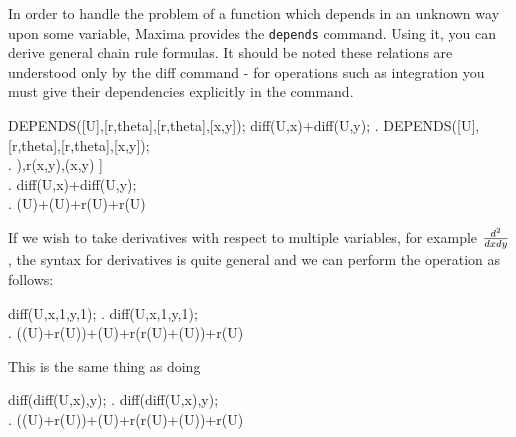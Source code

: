 In order to handle the problem of a function which depends
in an unknown way upon some variable, Maxima provides
the {\tt depends} command.  Using it, you can derive
general chain rule formulas.  It should be noted these
relations are understood only by the diff command - 
for operations such as integration you must give their 
dependencies explicitly in the command.

\beginmaximasession
DEPENDS([U],[r,theta],[r,theta],[x,y]);
diff(U,x)+diff(U,y);
\maximatexsession
{}.  DEPENDS([U],[r,theta],[r,theta],[x,y]); \\
.  \left[ U\left(r,\linebreak[0]\vartheta\right),\linebreak[0]r\left(x,\linebreak[0]y\right),\linebreak[0]\vartheta\left(x,\linebreak[0]y\right) \right] \\
.  diff(U,x)+diff(U,y); \\
.  \*\vartheta\*\left(\*U\right)+\*\vartheta\*\left(\*U\right)+\*r\*\left(\*U\right)+\*r\*\left(\*U\right) \\
\endmaximasession

If we wish to take derivatives with respect to multiple variables,
for example $d^2\over{dxdy}$, the syntax for derivatives is quite
general and we can perform the operation as follows:

\beginmaximasession
diff(U,x,1,y,1);
\maximatexsession
{}.  diff(U,x,1,y,1); \\
.  \*\vartheta\*\left(\*\vartheta\*\left(\*U\right)+\*r\*\left(\*U\right)\right)+\*\vartheta\*\left(\*U\right)+\*r\*\left(\*r\*\left(\*U\right)+\*\vartheta\*\left(\*U\right)\right)+\*r\*\left(\*U\right) \\
\endmaximasession

This is the same thing as doing

\beginmaximasession
diff(diff(U,x),y);
\maximatexsession
{}.  diff(diff(U,x),y); \\
.  \*\vartheta\*\left(\*\vartheta\*\left(\*U\right)+\*r\*\left(\*U\right)\right)+\*\vartheta\*\left(\*U\right)+\*r\*\left(\*r\*\left(\*U\right)+\*\vartheta\*\left(\*U\right)\right)+\*r\*\left(\*U\right) \\
\endmaximasession


